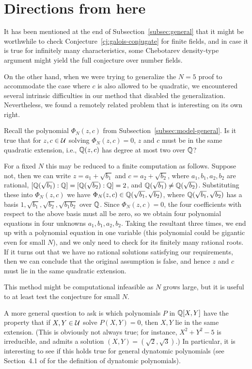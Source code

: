 \section{Directions from here}
\label{sec:map}

It has been mentioned at the end of Subsection~\ref{subsec:general}
that it might be worthwhile to check
Conjecture~\ref{cj:galois-conjugate} for finite fields, and in case it
is true for infinitely many characteristics, some Chebotarev
density-type argument might yield the full conjecture over number
fields.

On the other hand, when we were trying to generalize the $N = 5$ proof
to accommodate the case where $c$ is also allowed to be quadratic, we
encountered several intrinsic difficulties in our method that disabled
the generalization. Nevertheless, we found a remotely related problem
that is interesting on its own right.

\begin{question}
  \label{q:z-c-same-extension}
  Recall the polynomial $\Phi_N(z, c)$ from
  Subsection~\ref{subsec:model-general}. Is it true that for $z, c \in
  \mathcal{U}$ solving $\Phi_N(z, c) = 0$, $z$ and $c$ must be in the same
  quadratic extension, i.e., $\mathbb{Q}(z, c)$ has degree at most two over
  $\mathbb{Q}$?
\end{question}

For a fixed $N$ this may be reduced to a finite computation as
follows. Suppose not, then we can write $z = a_1 + \sqrt{b_1}$ and $c
= a_2 + \sqrt{b_2}$, where $a_1, b_1, a_2, b_2$ are rational,
$[\mathbb{Q}(\sqrt{b_1}) : \mathbb{Q}] = [\mathbb{Q}(\sqrt{b_2}) : \mathbb{Q}] = 2$, and
$\mathbb{Q}(\sqrt{b_1}) \ne \mathbb{Q}(\sqrt{b_2})$. Substituting these into
$\Phi_N(z, c)$ we have $\Phi_N(z, c) \in \mathbb{Q}(\sqrt{b_1}, \sqrt{b_2})$,
where $\mathbb{Q}(\sqrt{b_1}, \sqrt{b_2})$ has a basis $1, \sqrt{b_1},
\sqrt{b_2}, \sqrt{b_1 b_2}$ over $\mathbb{Q}$. Since $\Phi_N(z, c) = 0$, the
four coefficients with respect to the above basis must all be zero, so
we obtain four polynomial equations in four unknowns $a_1, b_1, a_2,
b_2$. Taking the resultant three times, we end up with a polynomial
equation in one variable (this polynomial could be gigantic even for
small $N$), and we only need to check for its finitely many rational
roots. If it turns out that we have no rational solutions satisfying
our requirements, then we can conclude that the original assumption is
false, and hence $z$ and $c$ must lie in the same quadratic extension.

This method might be computational infeasible as $N$ grows large, but
it is useful to at least test the conjecture for small $N$.

A more general question to ask is which polynomials $P$ in $\mathbb{Q}[X, Y]$
have the property that if $X, Y \in \mathcal{U}$ solve $P(X, Y) = 0$, then $X,
Y$ lie in the same extension. (This is obviously not always true; for
instance, $X^2 + Y^2 - 5$ is irreducible, and admits a solution $(X,
Y) = (\sqrt{2}, \sqrt{3})$.) In particular, it is interesting to see
if this holds true for general dynatomic polynomials (see Section~4.1
of \cite{MR2316407} for the definition of dynatomic polynomials).

